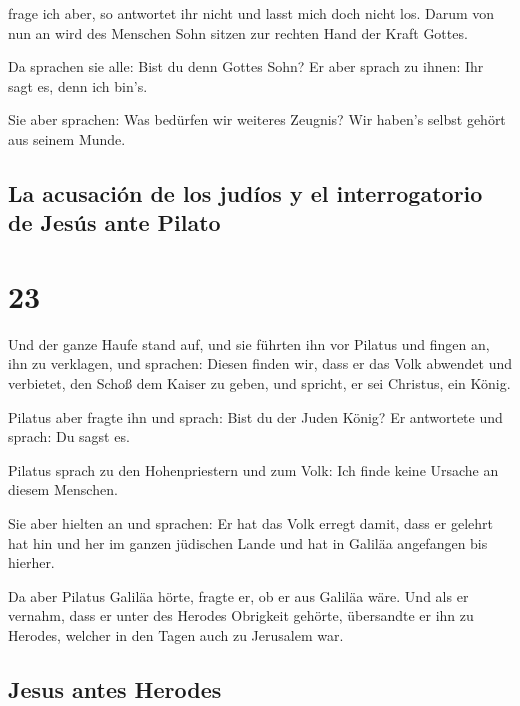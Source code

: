  frage ich aber, so antwortet ihr nicht und lasst mich
doch nicht los.  Darum von nun an wird des Menschen Sohn
sitzen zur rechten Hand der Kraft Gottes.

 Da sprachen sie alle: Bist du denn Gottes Sohn? Er aber
sprach zu ihnen: Ihr sagt es, denn ich bin's.

 Sie aber sprachen: Was bedürfen wir weiteres Zeugnis?
Wir haben's selbst gehört aus seinem Munde.

\hypertarget{la-acusaciuxf3n-de-los-juduxedos-y-el-interrogatorio-de-jesuxfas-ante-pilato}{%
\subsection{La acusación de los judíos y el interrogatorio de Jesús ante
Pilato}\label{la-acusaciuxf3n-de-los-juduxedos-y-el-interrogatorio-de-jesuxfas-ante-pilato}}

\hypertarget{section-22}{%
\section{23}\label{section-22}}

 Und der ganze Haufe stand auf, und sie führten ihn vor
Pilatus  und fingen an, ihn zu verklagen, und sprachen:
Diesen finden wir, dass er das Volk abwendet und verbietet, den Schoß
dem Kaiser zu geben, und spricht, er sei Christus, ein König.

 Pilatus aber fragte ihn und sprach: Bist du der Juden
König? Er antwortete und sprach: Du sagst es.

 Pilatus sprach zu den Hohenpriestern und zum Volk: Ich
finde keine Ursache an diesem Menschen.

 Sie aber hielten an und sprachen: Er hat das Volk erregt
damit, dass er gelehrt hat hin und her im ganzen jüdischen Lande und hat
in Galiläa angefangen bis hierher.

 Da aber Pilatus Galiläa hörte, fragte er, ob er aus
Galiläa wäre.  Und als er vernahm, dass er unter des
Herodes Obrigkeit gehörte, übersandte er ihn zu Herodes, welcher in den
Tagen auch zu Jerusalem war.

\hypertarget{jesus-antes-herodes}{%
\subsection{Jesus antes Herodes}\label{jesus-antes-herodes}}


